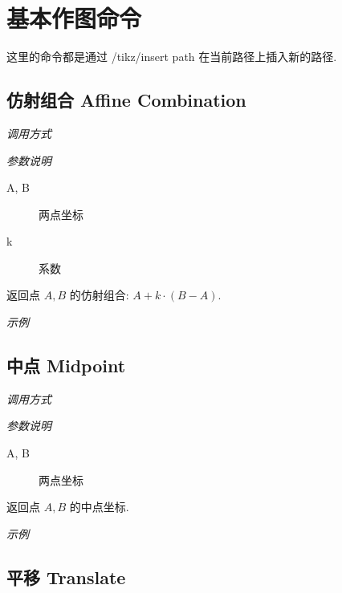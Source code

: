 \chapter{基本作图命令}

这里的命令都是通过 /tikz/insert path\cite{PATH} 在当前路径上插入新的路径.

\section{仿射组合 Affine Combination}

\emph{调用方式}

\begin{tcolorbox}{}
\end{tcolorbox}

\emph{参数说明}

\begin{description}
  \item[A, B] 两点坐标
  \item[k] 系数
\end{description}

返回点 $A, B$ 的仿射组合: $A + k \cdot (B-A)$.

\emph{示例}


\section{中点 Midpoint}

\emph{调用方式}

\begin{tcolorbox}{}
\end{tcolorbox}

\emph{参数说明}

\begin{description}
  \item[A, B] 两点坐标
\end{description}

返回点 $A, B$ 的中点坐标.

\emph{示例}


\section{平移 Translate}

